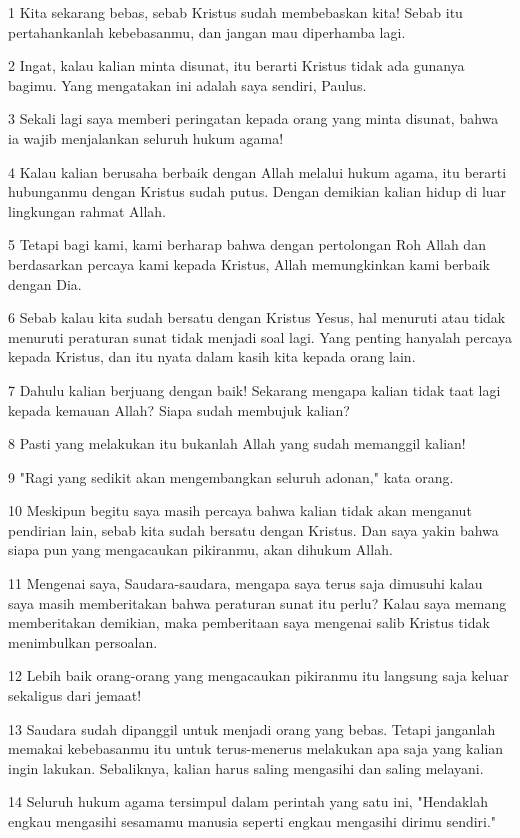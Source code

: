 \par 1 Kita sekarang bebas, sebab Kristus sudah membebaskan kita! Sebab itu pertahankanlah kebebasanmu, dan jangan mau diperhamba lagi.
\par 2 Ingat, kalau kalian minta disunat, itu berarti Kristus tidak ada gunanya bagimu. Yang mengatakan ini adalah saya sendiri, Paulus.
\par 3 Sekali lagi saya memberi peringatan kepada orang yang minta disunat, bahwa ia wajib menjalankan seluruh hukum agama!
\par 4 Kalau kalian berusaha berbaik dengan Allah melalui hukum agama, itu berarti hubunganmu dengan Kristus sudah putus. Dengan demikian kalian hidup di luar lingkungan rahmat Allah.
\par 5 Tetapi bagi kami, kami berharap bahwa dengan pertolongan Roh Allah dan berdasarkan percaya kami kepada Kristus, Allah memungkinkan kami berbaik dengan Dia.
\par 6 Sebab kalau kita sudah bersatu dengan Kristus Yesus, hal menuruti atau tidak menuruti peraturan sunat tidak menjadi soal lagi. Yang penting hanyalah percaya kepada Kristus, dan itu nyata dalam kasih kita kepada orang lain.
\par 7 Dahulu kalian berjuang dengan baik! Sekarang mengapa kalian tidak taat lagi kepada kemauan Allah? Siapa sudah membujuk kalian?
\par 8 Pasti yang melakukan itu bukanlah Allah yang sudah memanggil kalian!
\par 9 "Ragi yang sedikit akan mengembangkan seluruh adonan," kata orang.
\par 10 Meskipun begitu saya masih percaya bahwa kalian tidak akan menganut pendirian lain, sebab kita sudah bersatu dengan Kristus. Dan saya yakin bahwa siapa pun yang mengacaukan pikiranmu, akan dihukum Allah.
\par 11 Mengenai saya, Saudara-saudara, mengapa saya terus saja dimusuhi kalau saya masih memberitakan bahwa peraturan sunat itu perlu? Kalau saya memang memberitakan demikian, maka pemberitaan saya mengenai salib Kristus tidak menimbulkan persoalan.
\par 12 Lebih baik orang-orang yang mengacaukan pikiranmu itu langsung saja keluar sekaligus dari jemaat!
\par 13 Saudara sudah dipanggil untuk menjadi orang yang bebas. Tetapi janganlah memakai kebebasanmu itu untuk terus-menerus melakukan apa saja yang kalian ingin lakukan. Sebaliknya, kalian harus saling mengasihi dan saling melayani.
\par 14 Seluruh hukum agama tersimpul dalam perintah yang satu ini, "Hendaklah engkau mengasihi sesamamu manusia seperti engkau mengasihi dirimu sendiri."
